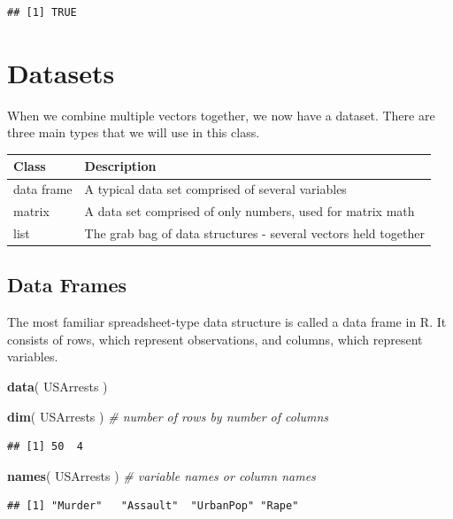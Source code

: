 \documentclass[]{book}
\newenvironment{Shaded}{\begin{snugshade}}{\end{snugshade}}
\newcommand{\CommentTok}[1]{\textcolor[rgb]{0.56,0.35,0.01}{\textit{#1}}}
\newcommand{\KeywordTok}[1]{\textcolor[rgb]{0.13,0.29,0.53}{\textbf{#1}}}
\newcommand{\NormalTok}[1]{#1}
\theoremstyle{definition}
\theoremstyle{definition}
\theoremstyle{definition}
\theoremstyle{remark}
\begin{document}
\begin{verbatim}
## [1] TRUE
\end{verbatim}

\hypertarget{datasets}{%
\section{Datasets}\label{datasets}}

When we combine multiple vectors together, we now have a dataset. There
are three main types that we will use in this class.

\begin{longtable}[]{@{}ll@{}}
\toprule
Class & Description\tabularnewline
\midrule
\endhead
data frame & A typical data set comprised of several
variables\tabularnewline
matrix & A data set comprised of only numbers, used for matrix
math\tabularnewline
list & The grab bag of data structures - several vectors held
together\tabularnewline
\bottomrule
\end{longtable}

\hypertarget{data-frames}{%
\subsection{Data Frames}\label{data-frames}}

The most familiar spreadsheet-type data structure is called a data frame
in R. It consists of rows, which represent observations, and columns,
which represent variables.

\begin{Shaded}
\begin{Highlighting}[]
\KeywordTok{data}\NormalTok{( USArrests )}

\KeywordTok{dim}\NormalTok{( USArrests )   }\CommentTok{# number of rows by number of columns}
\end{Highlighting}
\end{Shaded}

\begin{verbatim}
## [1] 50  4
\end{verbatim}

\begin{Shaded}
\begin{Highlighting}[]
\KeywordTok{names}\NormalTok{( USArrests )   }\CommentTok{# variable names or column names}
\end{Highlighting}
\end{Shaded}

\begin{verbatim}
## [1] "Murder"   "Assault"  "UrbanPop" "Rape"
\end{verbatim}
\end{document}
